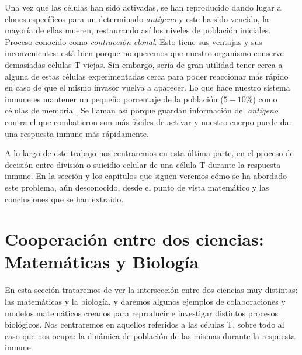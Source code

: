 Una vez que las células han sido activadas, se han reproducido dando lugar a clones específicos para un determinado \textit{antígeno} y este ha sido vencido, la mayoría de ellas mueren, restaurando así los niveles de población iniciales. Proceso conocido como \textit{contracción clonal}. Esto tiene sus ventajas y sus inconvenientes: está bien porque no queremos que nuestro organismo conserve demasiadas células T viejas. Sin embargo, sería de gran utilidad tener cerca a alguna de estas células experimentadas cerca para poder reaccionar más rápido en caso de que el mismo invasor vuelva a aparecer. Lo que hace nuestro sistema inmune es mantener un pequeño porcentaje de la población  ($5-10\%$) como células de memoria \citep{JTB}. Se llaman así porque guardan información del \textit{antígeno} contra el que combatieron son más fáciles de activar y nuestro cuerpo puede dar una respuesta inmune más rápidamente.

A lo largo de este trabajo nos centraremos en esta última parte, en el proceso de decisión entre división o suicidio celular de una célula T durante la respuesta inmune. En la sección y los capítulos que siguen veremos cómo se ha abordado este problema, aún desconocido, desde el punto de vista matemático y las conclusiones que se han extraído. 


\section{Cooperación entre dos ciencias: Matemáticas y Biología}
\label{sec:coop}

En esta sección trataremos de ver la intersección entre dos ciencias muy distintas: las matemáticas y la biología, y daremos algunos ejemplos de colaboraciones y modelos matemáticos creados para reproducir e investigar distintos procesos biológicos. Nos centraremos en aquellos referidos a las células T, sobre todo al caso que nos ocupa: la dinámica de población de las mismas durante la respuesta inmune.

